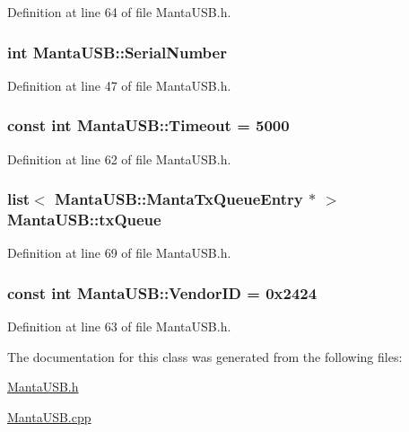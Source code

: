 \-Definition at line 64 of file \-Manta\-U\-S\-B.\-h.

\hypertarget{classMantaUSB_a665d9f2432ded4c447e53dba384cbb69}{
\subsubsection[{\-Serial\-Number}]{\setlength{\rightskip}{0pt plus 5cm}int {\bf \-Manta\-U\-S\-B\-::\-Serial\-Number}}}\label{classMantaUSB_a665d9f2432ded4c447e53dba384cbb69}


\-Definition at line 47 of file \-Manta\-U\-S\-B.\-h.

\hypertarget{classMantaUSB_aa2a88b5675ef513922f1bd4748d12181}{
\subsubsection[{\-Timeout}]{\setlength{\rightskip}{0pt plus 5cm}const int {\bf \-Manta\-U\-S\-B\-::\-Timeout} = 5000}}\label{classMantaUSB_aa2a88b5675ef513922f1bd4748d12181}


\-Definition at line 62 of file \-Manta\-U\-S\-B.\-h.

\hypertarget{classMantaUSB_ab647636b02371d10ccedaf719b6b7de2}{
\subsubsection[{tx\-Queue}]{\setlength{\rightskip}{0pt plus 5cm}list$<$ {\bf \-Manta\-U\-S\-B\-::\-Manta\-Tx\-Queue\-Entry} $\ast$ $>$ {\bf \-Manta\-U\-S\-B\-::tx\-Queue}}}\label{classMantaUSB_ab647636b02371d10ccedaf719b6b7de2}


\-Definition at line 69 of file \-Manta\-U\-S\-B.\-h.

\hypertarget{classMantaUSB_ad3b9f90c7681710d99dd984000a7859e}{
\subsubsection[{\-Vendor\-I\-D}]{\setlength{\rightskip}{0pt plus 5cm}const int {\bf \-Manta\-U\-S\-B\-::\-Vendor\-I\-D} = 0x2424}}\label{classMantaUSB_ad3b9f90c7681710d99dd984000a7859e}


\-Definition at line 63 of file \-Manta\-U\-S\-B.\-h.



\-The documentation for this class was generated from the following files\-:\begin{DoxyCompactItemize}
\item 
\hyperlink{MantaUSB_8h}{\-Manta\-U\-S\-B.\-h}\item 
\hyperlink{MantaUSB_8cpp}{\-Manta\-U\-S\-B.\-cpp}\end{DoxyCompactItemize}
